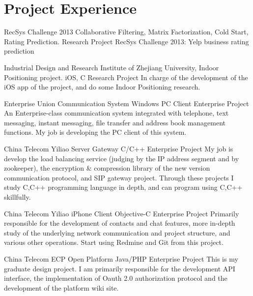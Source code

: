 \documentclass[11pt,a4paper]{moderncv}
\begin{document}
\section{Project Experience}
{RecSys Challenge 2013}
{Collaborative Filtering, Matrix Factorization, Cold Start, Rating Prediction. }
{Research Project}{}
{RecSys Challenge 2013: Yelp business rating prediction}

{Industrial Design and Research Institute of Zhejiang University, Indoor Positioning project.}
{iOS, C}
{Research Project}{}
{In charge of the development of the iOS app of the project, and do some Indoor Positioning research.}

{Enterprise Union Communication System}
{Windows PC Client}
{Enterprise Project}{}
{
An Enterprise-class communication system integrated with telephone, text messaging, instant messaging,
file transfer and address book management functions. My job is developing the PC client of this system.
}

\vspace*{0.2\baselineskip}
{China Telecom Yiliao Server Gateway}
{C/C++}
{Enterprise Project}{}
{
My job is develop the load balancing service (judging by the IP address segment and by zookeeper), 
the encryption \& compression library of the new version communication protocol, and SIP gateway project.
Through these projects I study  C,C++ programming language in depth, and can program using C,C++ skillfully.
}

\vspace*{0.2\baselineskip}
{China Telecom Yiliao iPhone Client}
{Objective-C}
{Enterprise Project}{}
{
Primarily responsible for the development of contacts and chat features, more in-depth study of the underlying network communication and project structure,
and various other operations. Start using Redmine and Git from this project.
}

\vspace*{0.2\baselineskip}
{China Telecom ECP Open Platform}
{Java/PHP}
{Enterprise Project}{}
{
This is my graduate design project. I am primarily responsible for the development API interface, the implementation of Oauth 2.0 authorization protocol
and the development of the platform wiki site.
}
\end{document}
